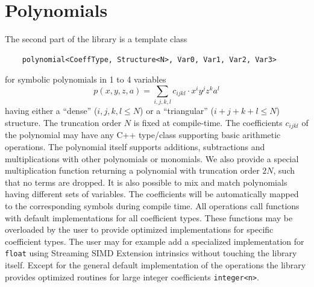 \documentclass[oribibl]{llncs2e/llncs}
\begin{document}
\section{Polynomials}
The second part of the library is a template class 
\begin{verbatim}
    polynomial<CoeffType, Structure<N>, Var0, Var1, Var2, Var3>
\end{verbatim}
for symbolic polynomials in 1 to 4 variables
\begin{equation}
    p(x,y,z,a) = \sum_{i,j,k,l} c_{ijkl} \cdot x^i y^j z^k a^l
\end{equation}
having either a ``dense'' (${i,j,k,l} \le N$) or a ``triangular'' ($i+j+k+l \le N$) structure.
The truncation order $N$ is fixed at compile-time.
The coefficients $c_{ijkl}$ of the polynomial may have any C++ type/class supporting basic arithmetic operations.
The polynomial itself supports additions, subtractions and multiplications with other polynomials or monomials.
We also provide a special multiplication function returning a polynomial with truncation order $2N$, such that no terms are dropped.
It is also possible to mix and match polynomials having different sets of variables.
The coefficients will be automatically mapped to the corresponding symbols during compile time.
All operations call functions with default implementations for all coefficient types.
These functions may be overloaded by the user to provide optimized implementations for specific coefficient types.
The user may for example add a specialized implementation for \verb|float| using Streaming SIMD Extension intrinsics without touching the library itself.
Except for the general default implementation of the operations the library provides optimized routines for large integer coefficients \verb|integer<n>|.

\end{document}
